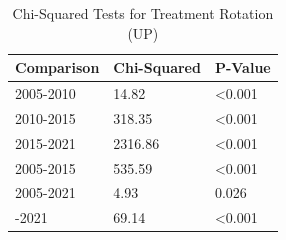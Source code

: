 \begin{table}[!h]
\centering
\caption{\label{tab:chi_sq_up}Chi-Squared Tests for Treatment Rotation (UP)}
\centering
\fontsize{8}{10}\selectfont
\begin{tabular}[t]{lll}
\toprule
Comparison & Chi-Squared & P-Value\\
\midrule
2005-2010 & 14.82 & <0.001\\
2010-2015 & 318.35 & <0.001\\
2015-2021 & 2316.86 & <0.001\\
2005-2015 & 535.59 & <0.001\\
2005-2021 & 4.93 & 0.026\\
\addlinespace
2010-2021 & 69.14 & <0.001\\
\bottomrule
\end{tabular}
\end{table}
